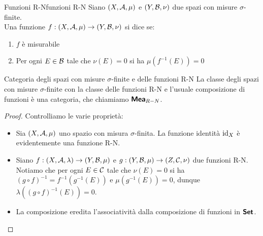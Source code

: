 \documentclass{article}
\begin{document}
\begin{definition}{Funzioni R-N}{funzioni R-N}
    Siano $(X,\mathcal{A},\mu)$ e $(Y,\mathcal{B},\nu)$ due spazi con misure $\sigma$-finite.\\
    Una funzione $f:(X,\mathcal{A},\mu)\to(Y,\mathcal{B},\nu)$ si dice  se:\begin{enumerate}
        \item $f$ è misurabile
        \item Per ogni $E \in \mathcal{B}$ tale che $\nu(E) = 0$ si ha $\mu(f^{-1}(E))=0$
    \end{enumerate}    
\end{definition}
\begin{remark}{Categoria degli spazi con misure $\sigma$-finite e delle funzioni R-N}{}
    La classe degli spazi con misure $\sigma$-finite con la classe delle funzioni R-N e l'usuale composizione di funzioni è una categoria, che chiamiamo $\text{\sffamily\textbf{Mea}}_{R-N}$.
    \begin{proof}
        Controlliamo le varie proprietà:
        \begin{itemize}
            \item Sia $(X,\mathcal{A},\mu)$ uno spazio con misura $\sigma$-finita. La funzione identità $\operatorname{id}_{X}$ è evidentemente una funzione R-N.
            \item Siano $f:(X,\mathcal{A},\lambda)\to (Y,\mathcal{B},\mu)$ e $g:(Y,\mathcal{B},\mu)\to(Z,\mathcal{C},\nu)$ due funzioni R-N. Notiamo che per ogni $E \in \mathcal{C}$ tale che $\nu(E) = 0$ si ha $(g\circ f)^{-1} = f^{-1}(g^{-1}(E))$ e $\mu(g^{-1}(E)) = 0$, dunque $\lambda((g\circ f)^{-1}(E))=0$.
            \item La composizione eredita l'associatività dalla composizione di funzioni in $\text{\sffamily\textbf{Set}}$.
        \end{itemize}
    \end{proof}
\end{remark}

\end{document}
